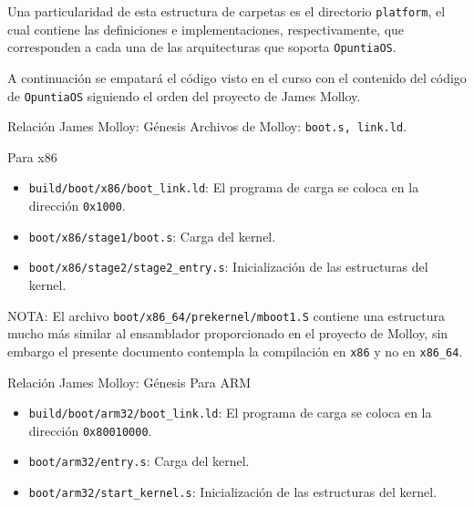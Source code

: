 \begin{frame}
	\begin{figure}[ht]
		\centering
		\hspace{3cm}
	\end{figure}
\end{frame}


\begin{frame}
	Una particularidad de esta estructura de carpetas es el directorio \texttt{platform}, el cual contiene las definiciones e implementaciones, respectivamente, que corresponden a cada una de las arquitecturas que soporta \texttt{OpuntiaOS}.
	
	A continuación se empatará el código visto en el curso con el contenido del código de \texttt{OpuntiaOS} siguiendo el orden del proyecto de James Molloy.
\end{frame}


\begin{frame}{Relación James Molloy: Génesis}
	Archivos de Molloy: \texttt{boot.s, link.ld}.
	
	Para x86
	\begin{itemize} \setlength\itemsep{0pt} \footnotesize
		\item \texttt{build/boot/x86/boot\_link.ld}: El programa de carga se coloca en la dirección \texttt{0x1000}.
		\item \texttt{boot/x86/stage1/boot.s}: Carga del kernel.
		\item \texttt{boot/x86/stage2/stage2\_entry.s}: Inicialización de las estructuras del kernel.
	\end{itemize}
	
	NOTA: El archivo \texttt{boot/x86\_64/prekernel/mboot1.S} contiene una estructura mucho más similar al ensamblador proporcionado en el proyecto de Molloy, sin embargo el presente documento contempla la compilación en \texttt{x86} y no en \texttt{x86\_64}.
\end{frame}

\begin{frame}{Relación James Molloy: Génesis}
	Para ARM
	\begin{itemize} \setlength\itemsep{0pt} \footnotesize
		\item \texttt{build/boot/arm32/boot\_link.ld}: El programa de carga se coloca en la dirección \texttt{0x80010000}.
		\item \texttt{boot/arm32/entry.s}: Carga del kernel.
		\item \texttt{boot/arm32/start\_kernel.s}: Inicialización de las estructuras del kernel.
	\end{itemize}
\end{frame}



